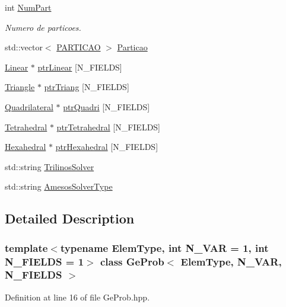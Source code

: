 \begin{DoxyCompactItemize}
\item 
int \hyperlink{classGeProb_ab269c3e7eeb6ae7c5fd87ae54df757b2}{Num\+Part}
\begin{DoxyCompactList}\small\item\em Numero de particoes. \end{DoxyCompactList}\item 
std\+::vector$<$ \hyperlink{structPARTICAO}{P\+A\+R\+T\+I\+C\+AO} $>$ \hyperlink{classGeProb_a39012a295f18016463a00946affc3818}{Particao}
\item 
\hyperlink{classLinear}{Linear} $\ast$ \hyperlink{classGeProb_af9350545b7ee2ebe6488a50dd1f38c8c}{ptr\+Linear} \mbox{[}N\+\_\+\+F\+I\+E\+L\+DS\mbox{]}
\item 
\hyperlink{classTriangle}{Triangle} $\ast$ \hyperlink{classGeProb_a9fa6ab6ca8b9a2352642a72042d8cf4d}{ptr\+Triang} \mbox{[}N\+\_\+\+F\+I\+E\+L\+DS\mbox{]}
\item 
\hyperlink{classQuadrilateral}{Quadrilateral} $\ast$ \hyperlink{classGeProb_ada73c5b700f7681fde499a3a27ff377e}{ptr\+Quadri} \mbox{[}N\+\_\+\+F\+I\+E\+L\+DS\mbox{]}
\item 
\hyperlink{classTetrahedral}{Tetrahedral} $\ast$ \hyperlink{classGeProb_a4e2d7b57253812234e2417097659c40c}{ptr\+Tetrahedral} \mbox{[}N\+\_\+\+F\+I\+E\+L\+DS\mbox{]}
\item 
\hyperlink{classHexahedral}{Hexahedral} $\ast$ \hyperlink{classGeProb_aecb008dc7914d62933407aecbcbbae0a}{ptr\+Hexahedral} \mbox{[}N\+\_\+\+F\+I\+E\+L\+DS\mbox{]}
\item 
std\+::string \hyperlink{classGeProb_aac89bac6728a7f42998e0edb80dc835d}{Trilinos\+Solver}
\item 
std\+::string \hyperlink{classGeProb_a000f412eadf9ce5cf4f5391012283330}{Amesos\+Solver\+Type}
\end{DoxyCompactItemize}


\subsection{Detailed Description}
\subsubsection*{template$<$typename Elem\+Type, int N\+\_\+\+V\+AR = 1, int N\+\_\+\+F\+I\+E\+L\+DS = 1$>$\newline
class Ge\+Prob$<$ Elem\+Type, N\+\_\+\+V\+A\+R, N\+\_\+\+F\+I\+E\+L\+D\+S $>$}



Definition at line 16 of file Ge\+Prob.\+hpp.



